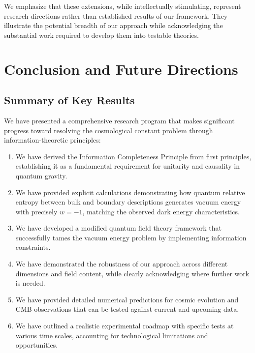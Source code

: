 \documentclass[12pt]{article}
\theoremstyle{plain}
\theoremstyle{definition}
\theoremstyle{remark}
\begin{document}
We emphasize that these extensions, while intellectually stimulating, represent research directions rather than established results of our framework. They illustrate the potential breadth of our approach while acknowledging the substantial work required to develop them into testable theories.

\section{Conclusion and Future Directions}

\subsection{Summary of Key Results}

We have presented a comprehensive research program that makes significant progress toward resolving the cosmological constant problem through information-theoretic principles:

\begin{enumerate}
\item We have derived the Information Completeness Principle from first principles, establishing it as a fundamental requirement for unitarity and causality in quantum gravity.

\item We have provided explicit calculations demonstrating how quantum relative entropy between bulk and boundary descriptions generates vacuum energy with precisely $w = -1$, matching the observed dark energy characteristics.

\item We have developed a modified quantum field theory framework that successfully tames the vacuum energy problem by implementing information constraints.

\item We have demonstrated the robustness of our approach across different dimensions and field content, while clearly acknowledging where further work is needed.

\item We have provided detailed numerical predictions for cosmic evolution and CMB observations that can be tested against current and upcoming data.

\item We have outlined a realistic experimental roadmap with specific tests at various time scales, accounting for technological limitations and opportunities.
\end{enumerate}
\end{document}
